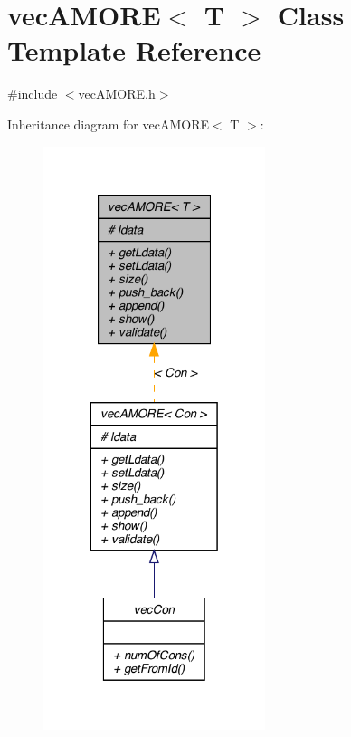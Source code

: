 \hypertarget{classvec_a_m_o_r_e}{
\section{vecAMORE$<$ T $>$ Class Template Reference}
\label{classvec_a_m_o_r_e}
}


{\ttfamily \#include $<$vecAMORE.h$>$}



Inheritance diagram for vecAMORE$<$ T $>$:\nopagebreak
\begin{figure}[H]
\begin{center}
\leavevmode
\includegraphics[width=184pt]{classvec_a_m_o_r_e__inherit__graph}
\end{center}
\end{figure}
